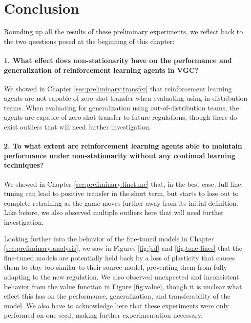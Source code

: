 \section{Conclusion} \label{sec:preliminary:conclusion}
Rounding up all the results of these preliminary experiments, we reflect back to the two questions posed at the beginning of this chapter:

\paragraph{1. What effect does non-stationarity have on the performance and generalization of reinforcement learning agents in VGC?}
We showed in Chapter \ref{sec:preliminary:transfer} that reinforcement learning agents are not capable of zero-shot transfer when evaluating using in-distribution teams.
When evaluating for generalization using out-of-distribution teams, the agents are capable of zero-shot transfer to future regulations, though there do exist outliers that will need further investigation.

\paragraph{2. To what extent are reinforcement learning agents able to maintain performance under non-stationarity without any continual learning techniques?}
We showed in Chapter \ref{sec:preliminary:finetune} that, in the best case, full fine-tuning can lead to positive transfer in the short term, but starts to lose out to complete retraining as the game moves further away from its initial definition.
Like before, we also observed multiple outliers here that will need further investigation.

Looking further into the behavior of the fine-tuned models in Chapter \ref{sec:preliminary:analysis}, we saw in Figures \ref{fig:jsd} and \ref{fig:tsne-lines} that the fine-tuned models are potentially held back by a loss of plasticity that causes them to stay too similar to their source model, preventing them from fully adapting to the new regulation.
We also observed unexpected and inconsistent behavior from the value function in Figure \ref{fig:value}, though it is unclear what effect this has on the performance, generalization, and transferability of the model.
We also have to acknowledge here that these experiments were only performed on one seed, making further experimentation necessary.
